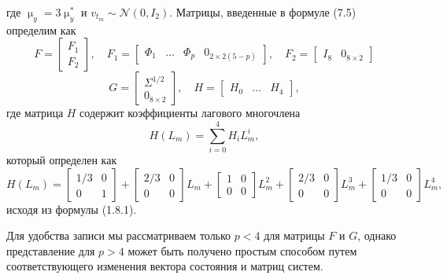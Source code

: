 \documentclass[a4paper, 12pt]{extarticle}
\numberwithin{equation}{subsection}
\renewcommand{\mu}{\upmu}
\begin{document}
	где $\mu_y = 3 \mu_y^*$ и $v_{t_m} \sim \mathcal{N} (0, I_2)$. Матрицы, введенные в формуле (7.5) определим как 
	\begin{equation}
		F=\begin{bmatrix}
		F_1 \\ F_2
	\end{bmatrix},\quad F_1 = \begin{bmatrix}
		\Phi_1 & \ldots & \Phi_p & 0_{2\times 2(5-p)}
	\end{bmatrix},\quad F_2 = \begin{bmatrix}
		I_8 & 0_{8\times 2}
	\end{bmatrix}
	\end{equation}
	\begin{equation}
		G = \begin{bmatrix}
		\Sigma^{1/2}\\ 0_{8\times2}
	\end{bmatrix},\quad H = \begin{bmatrix}
		H_0 & \ldots & H_4
	\end{bmatrix},
	\end{equation}
	где матрица $H$ содержит коэффициенты лагового многочлена \begin{equation}
		H(L_m) = \sum_{i=0}^{4}H_iL_m^i,
	\end{equation}
	который определен как 
	\begin{equation}
		H(L_m) = \begin{bmatrix}
		1/3 & 0 \\ 0 & 1
	\end{bmatrix} + \begin{bmatrix}
		2/3 & 0\\
		0 & 0
	\end{bmatrix} L_m + \begin{bmatrix}
		1 & 0\\
		0 & 0
	\end{bmatrix}L_m^2 + \begin{bmatrix}
		2/3 & 0\\
		0 & 0
	\end{bmatrix}L_m^3 + \begin{bmatrix}
		1/3 & 0 \\ 0 & 0
	\end{bmatrix}L_m^4,
	\end{equation}
	исходя из формулы (1.8.1).
	
	Для удобства записи мы рассматриваем
	только $p<4$ для матрицы $F$ и $G$, однако представление для $p > 4$ может быть получено простым способом путем соответствующего изменения вектора состояния и матриц систем.
\end{document}
